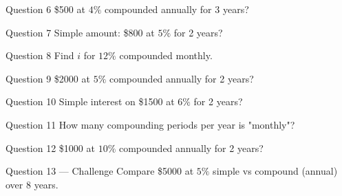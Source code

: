 \documentclass[11pt]{article}
\begin{document}
\begin{qbox}{Question 6}
\$500 at $4\%$ compounded annually for 3 years?\workspace{2.4cm}
\end{qbox}

\begin{qbox}{Question 7}
Simple amount: \$800 at $5\%$ for 2 years?\workspace{2.4cm}
\end{qbox}

\begin{qbox}{Question 8}
Find $i$ for $12\%$ compounded monthly.\workspace{2.4cm}
\end{qbox}

\begin{qbox}{Question 9}
\$2000 at $5\%$ compounded annually for 2 years?\workspace{2.4cm}
\end{qbox}

\begin{qbox}{Question 10}
Simple interest on \$1500 at $6\%$ for 2 years?\workspace{2.4cm}
\end{qbox}

\begin{qbox}{Question 11}
How many compounding periods per year is "monthly"?\workspace{2.4cm}
\end{qbox}

\begin{qbox}{Question 12}
\$1000 at $10\%$ compounded annually for 2 years?\workspace{2.4cm}
\end{qbox}

\begin{qbox}{Question 13 --- Challenge}
Compare \$5000 at $5\%$ simple vs compound (annual) over 8 years.\workspace{3.5cm}
\end{qbox}

\clearpage
{}
\end{document}
